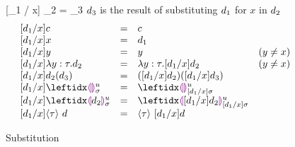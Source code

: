\begin{figure}[t]
\judgbox
  {[\dexp_1 / x] \dexp_2 = \dexp_3}
  {$d_3$ is the result of substituting $d_1$ for $x$ in $d_2$}
\[
\begin{array}{lcll}
[\dexp_1 / x] c
&=&
c\\
{[\dexp_1 / x] x}
&=&
\dexp_1\\
{[\dexp_1 / x] y}
&=&
y & (y \neq x)\\
{[\dexp_1 / x] \dlam{y}{\htau}{\dexp_2}}
&=&
{\dlam{y}{\htau}{[\dexp_1 / x] \dexp_2}}
& (y \neq x)
\\
{[\dexp_1 / x] \dap{d_2}{d_3}}
&=&
{\dapP{[\dexp_1 / x] d_2}{[\dexp_1 / x] d_3}}
\\
{[\dexp_1 / x]} \dehole{\mvar}{\subst}{}
&=&
\dehole{\mvar}{[\dexp_1 / x] \subst}{}
\\
{[\dexp_1 / x] \dhole{\dexp_2}{\mvar}{\subst}{}}
&=&
\dhole{ [ \dexp_1 / x ] \dexp_2 }{\mvar}{[\dexp_1 / x] \subst}{}
\\
{[\dexp_1 / x] \dcast{\htau}{\dexp}}
&=&
\dcast{\htau}{[\dexp_1 / x] \dexp}
\end{array}
\]
\caption{Substitution}
\end{figure}
